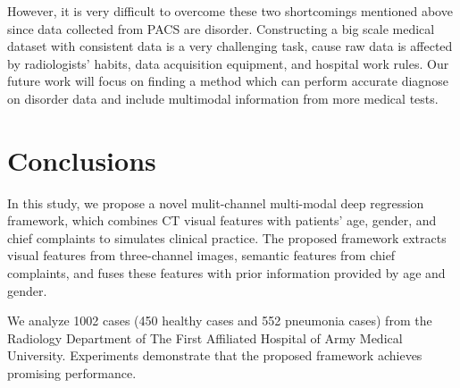 \documentclass[journal]{IEEEtran}
\begin{document}
However, it is very difficult to overcome these two shortcomings mentioned above since data collected from PACS are disorder. Constructing a big scale medical dataset with consistent data is a very challenging task, cause raw data is affected by radiologists' habits, data acquisition equipment, and hospital work rules. 
Our future work will focus on finding a method which can perform accurate diagnose on disorder data and include multimodal information from more medical tests.

\section{Conclusions}
\label{conclusions}
In this study, we propose a novel mulit-channel multi-modal deep regression framework, which combines CT visual features with patients' age, gender, and chief complaints to simulates clinical practice. 
The proposed framework extracts visual features from three-channel images, semantic features from chief complaints, and fuses these features with prior information provided by age and gender.

We analyze 1002 cases (450 healthy cases and 552 pneumonia cases) from the Radiology Department of The First Affiliated Hospital of Army Medical University. Experiments demonstrate that the proposed framework achieves promising performance.


\ifCLASSOPTIONcaptionsoff
  \newpage
\fi










%
\end{document}
